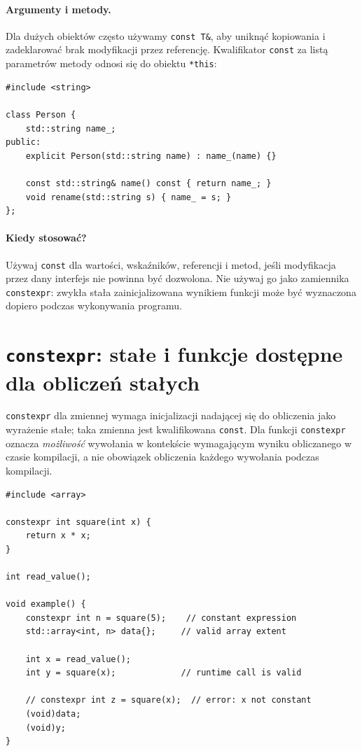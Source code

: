 \paragraph{Argumenty i metody.}
Dla dużych obiektów często używamy \texttt{const T\&}, aby uniknąć
kopiowania i zadeklarować brak modyfikacji przez referencję.
Kwalifikator \texttt{const} za listą parametrów metody odnosi się
do obiektu \texttt{*this}:

\begin{lstlisting}
#include <string>

class Person {
    std::string name_;
public:
    explicit Person(std::string name) : name_(name) {}

    const std::string& name() const { return name_; }
    void rename(std::string s) { name_ = s; }
};
\end{lstlisting}

\paragraph{Kiedy stosować?}
Używaj \texttt{const} dla wartości, wskaźników, referencji i metod,
jeśli modyfikacja przez dany interfejs nie powinna być dozwolona.
Nie używaj go jako zamiennika \texttt{constexpr}: zwykła stała
zainicjalizowana wynikiem funkcji może być wyznaczona dopiero podczas
wykonywania programu.

\section{\texttt{constexpr}: stałe i funkcje dostępne dla obliczeń stałych}

\texttt{constexpr} dla zmiennej wymaga inicjalizacji nadającej się
do obliczenia jako wyrażenie stałe; taka zmienna jest kwalifikowana
\texttt{const}. Dla funkcji \texttt{constexpr} oznacza \emph{możliwość}
wywołania w kontekście wymagającym wyniku obliczanego w czasie kompilacji,
a nie obowiązek obliczenia każdego wywołania podczas kompilacji.

\begin{lstlisting}
#include <array>

constexpr int square(int x) {
    return x * x;
}

int read_value();

void example() {
    constexpr int n = square(5);    // constant expression
    std::array<int, n> data{};     // valid array extent

    int x = read_value();
    int y = square(x);             // runtime call is valid

    // constexpr int z = square(x);  // error: x not constant
    (void)data;
    (void)y;
}
\end{lstlisting}

